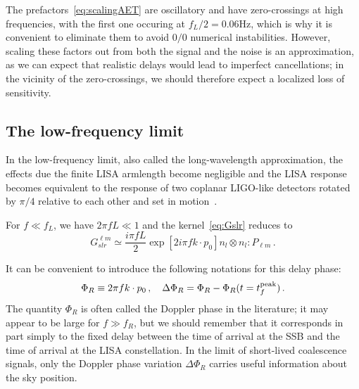 \documentclass[aps,showpacs,twocolumn,prd,superscriptaddress,nofootinbib]{revtex4-1}
\newcommand{\be}{\begin{equation}}
\newcommand{\ee}{\end{equation}}
\begin{document}
The prefactors~\eqref{eq:scalingAET} are oscillatory and have zero-crossings at high frequencies, with the first one occuring at $f_{L}/2 = 0.06 \mathrm{Hz}$, which is why it is convenient to eliminate them to avoid $0/0$ numerical instabilities. However, scaling these factors out from both the signal and the noise is an approximation, as we can expect that realistic delays would lead to imperfect cancellations; in the vicinity of the zero-crossings, we should therefore expect a localized loss of sensitivity.


\subsection{The low-frequency limit}
\label{subsec:lowfresponse}

In the low-frequency limit, also called the long-wavelength approximation, the effects due the finite LISA armlength become negligible and the LISA response becomes equivalent to the response of two coplanar LIGO-like detectors rotated by $\pi/4$ relative to each other and set in motion~\cite{Cutler97}.

For $f \ll f_{L}$, we have $2\pi f L \ll 1$ and the kernel~\eqref{eq:Gslr} reduces to
\be\label{eq:Gslrlowf}
	G^{\ell m}_{slr} \simeq \frac{i \pi f L}{2} \exp\left[ 2 i \pi f k\cdot p_{0} \right] n_{l} \otimes n_{l} : P_{\ell m}\,.
\ee

It can be convenient to introduce the following notations for this delay phase:
\be\label{eq:defPhiR}
	\Phi_{R} \equiv 2 \pi f k\cdot p_{0} \,, \quad \Delta \Phi_{R} = \Phi_{R} - \Phi_{R}(t=t_{f}^{\rm peak}) \,.
\ee
The quantity $\Phi_{R}$ is often called the Doppler phase in the literature; it may appear to be large for $f \gg f_{R}$, but we should remember that it corresponds in part simply to the fixed delay between the time of arrival at the SSB and the time of arrival at the LISA constellation. In the limit of short-lived coalescence signals, only the Doppler phase variation $\Delta \Phi_{R}$ carries useful information about the sky position.
\end{document}
